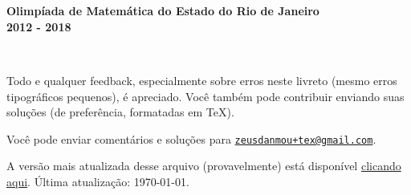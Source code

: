 \begin{center}
    \fontsize{.8cm}{1cm}\selectfont
    
    \hrulefill\\\vspace{-1.25em}
    \hrulefill\\
    
    \textbf{Olimpíada de Matemática do Estado do Rio de Janeiro \\ 2012 - 2018} \\\vspace{-.75em}
    
    \hrulefill\\\vspace{-1.25em}
    \hrulefill

    
    
\end{center}


\vfill

	{

		\noindent \footnotesize Todo e qualquer feedback, especialmente sobre erros neste livreto (mesmo erros tipográficos pequenos), é apreciado. Você também pode contribuir enviando suas soluções (de preferência, formatadas em \TeX).
		
		\noindent Você pode enviar comentários e soluções para \href{mailto:zeusdanmou+tex@gmail.com}{\texttt{zeusdanmou+tex@gmail.com}}.
		
		\noindent A versão mais atualizada desse arquivo (provavelmente) está disponível \textcolor{red}{\href{https://github.com/ZeusDM/latex-problems/blob/master/exams/math/brazil/rio/livreto/livreto_omerj.pdf?raw=true}{clicando aqui}}. Última atualização: \today.

}

